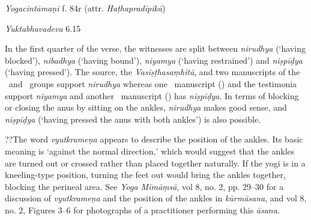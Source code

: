 \begin{ekdosis}
\begin{sources}[hp01_022]
\end{sources}

\begin{testimonia}[hp01_022]
\emph{Yogacintāmaṇi} f. 84r (attr. \emph{Haṭhapradīpikā})

\begin{versinnote}
\end{versinnote}

\emph{Yuktabhavadeva} 6.15

\begin{versinnote}
\end{versinnote}

\end{testimonia}

\begin{philcomm}[hp01_022]   
In the first quarter of the verse, the witnesses are split between \emph{nirudhya} (‘having blocked’), \emph{nibadhya} (‘having bound’), \emph{niyamya} (‘having restrained’) and \emph{niṣpīḍya} (‘having pressed’). The source, the \emph{Vasiṣṭhasaṃhitā}, and two manuscripts of the \textbeta\ and \textgamma\ groups support \emph{nirudhya} whereas one \textalpha\ manuscript () and the testimonia support \emph{niyamya} and another \textalpha\ manuscript () has \emph{niṣpīḍya}. In terms of blocking or closing the anus by sitting on the ankles, \emph{nirudhya} makes good sense, and \emph{niṣpīḍya} (`having pressed the anus with both ankles') is also possible.  

??The word \emph{vyutkrameṇa} appears to describe the position of the ankles. Its basic meaning is ‘against the normal direction,’ which would suggest that the ankles are turned out or crossed rather than placed together naturally. If the yogi is in a kneeling-type position, turning the feet out would bring the ankles together, blocking the perineal area. See \emph{Yoga Mīmāṃsā}, vol 8, no. 2, pp. 29–30 for a discussion of \emph{vyutkrameṇa} and the position of the ankles in \emph{kūrmāsana}, and vol 8, no. 2, Figures 3–6 for photographs of a practitioner performing this \emph{āsana}. 
\end{philcomm}


\end{ekdosis}
